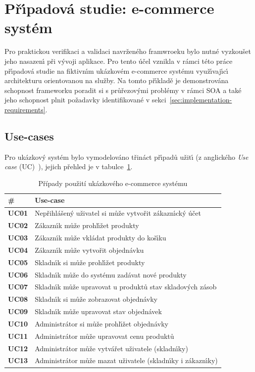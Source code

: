 \section{Př\'{\i}padová studie: e-commerce systém}

Pro praktickou verifikaci a validaci navrženého framwroeku bylo nutné vyzkoušet
jeho nasazen\'{\i} při v\'yvoji aplikace. Pro tento účel vznikla v
rámci této práce př\'{\i}padová studie na fiktivn\'{\i}m
ukázkovém e-commerce systému využ\'{\i}vaj\'{\i}c\'{\i} architekturu orientovanou na služby.
Na tomto př\'{\i}kladě je demonstrována schopnost frameworku poradit si s průřezov\'ymi
problémy v rámci \gls{SOA} a také jeho schopnost plnit požadavky identifikované v
sekci~\ref{sec:implementation-requirements}.

\subsection{Use-cases}

Pro ukázkov\'y systém bylo vymodelováno třináct př\'{\i}padů užit\'{\i}
(z anglického \textit{Use case} (\gls{UC})~\cite{bittner2002use}), jejich
přehled je v tabulce~\ref{tbl:use-cases}.

\begin{table}[h]
    \centering
    \begin{tabular*}{\textwidth}{ l l }
        \hline
        \textbf{\#} & \textbf{Use-case} \\
        \hline \hline
        \textbf{UC01} & Nepřihlášen\'y uživatel si může vytvořit zákazn\'{\i}ck\'y účet \\
        \textbf{UC02} & Zákazn\'{\i}k může prohl\'{\i}žet produkty \\
        \textbf{UC03} & Zákazn\'{\i}k může vkládat produkty do koš\'{\i}ku \\
        \textbf{UC04} & Zákazn\'{\i}k může vytvořit objednávku \\
        \textbf{UC05} & Skladn\'{\i}k si může prohl\'{\i}žet produkty \\
        \textbf{UC06} & Skladn\'{\i}k může do systému zadávat nové produkty \\
        \textbf{UC07} & Skladn\'{\i}k může upravovat u produktů stav skladov\'ych zásob \\
        \textbf{UC08} & Skladn\'{\i}k si může zobrazovat objednávky \\
        \textbf{UC09} & Skladn\'{\i}k může upravovat stav objednávek \\
        \textbf{UC10} & Administrátor si může prohl\'{\i}žet objednávky \\
        \textbf{UC11} & Administrátor může upravovat cenu produktů \\
        \textbf{UC12} & Administrátor může vytvářet uživatele (skladn\'{\i}ky) \\
        \textbf{UC13} & Administrátor může mazat uživatele (skladn\'{\i}ky i zákazn\'{\i}ky) \\
        \hline
    \end{tabular*}
    \caption{Případy použití ukázkového e-commerce systému}
    \label{tbl:use-cases}
\end{table}


